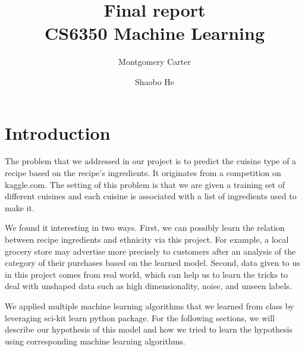 \documentclass[11pt]{article}
\title{Final report\\CS6350 Machine Learning}
\author{Montgomery Carter \and Shaobo He}
\begin{document}
\maketitle

\section{Introduction}
The problem that we addressed in our project is to predict the cuisine type of a
recipe based on the recipe's ingredients. It originates from a competition on kaggle.com\cite{kaggle-link}. The setting of this problem is that we are given a training set of different cuisines and each cuisine is associated with a list of ingredients used to make it.

We found it interesting in two ways. First, we can possibly learn the relation between recipe ingredients and ethnicity via this project. For example, a local grocery store may advertise more precisely to customers after an analysis of the category of their purchases based on the learned model. Second, data given to us in this project comes from real world, which can help us to learn the tricks to deal with unshaped data such as high dimensionality, noise, and unseen labels.

We applied multiple machine learning algorithms that we learned from class by leveraging sci-kit learn python package. For the following sections, we will describe our hypothesis of this model and how we tried to learn the hypothesis using corresponding machine learning algorithms.



\end{document}
